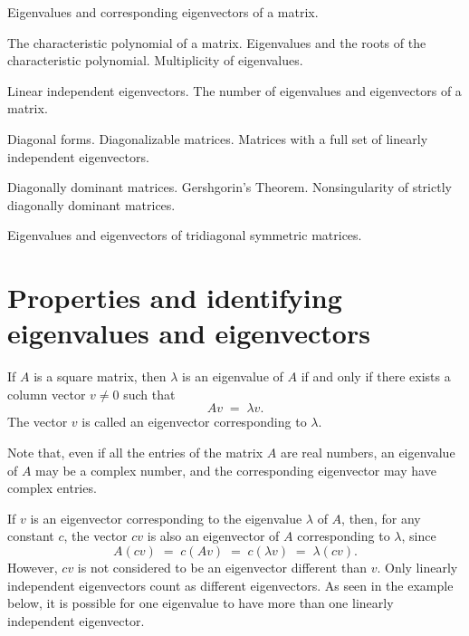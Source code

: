 
\noindent Eigenvalues and corresponding eigenvectors of a matrix.
\medskip

\noindent The characteristic polynomial of a matrix. Eigenvalues and the roots of the
characteristic polynomial. Multiplicity of eigenvalues.
\medskip

\noindent Linear independent eigenvectors. The number of eigenvalues and eigenvectors of a
matrix.
\medskip

\noindent Diagonal forms. Diagonalizable matrices. Matrices with a full set of linearly
independent eigenvectors.
\medskip

\noindent Diagonally dominant matrices. Gershgorin's Theorem. Nonsingularity of strictly
diagonally dominant matrices.
\medskip

\noindent Eigenvalues and eigenvectors of tridiagonal symmetric matrices.
\medskip

\section{Properties and identifying eigenvalues and eigenvectors}

\begin{definition}
If $A$ is a square matrix, then $\lambda$ is an eigenvalue of $A$ if and only if there
exists a column vector $v \neq 0$ such that
\begin{equation}
Av \;=\; \lambda v.
\end{equation}
The vector $v$ is called an eigenvector corresponding to $\lambda$.
\end{definition}

Note that, even if all the entries of the matrix $A$ are real numbers, an eigenvalue of
$A$ may be a complex number, and the corresponding eigenvector may have complex entries.

If $v$ is an eigenvector corresponding to the eigenvalue $\lambda$ of $A$, then, for any
constant $c$, the vector $cv$ is also an eigenvector of $A$ corresponding to $\lambda$,
since
\[
A(cv) \;=\; c(Av) \;=\; c(\lambda v) \;=\; \lambda(cv).
\]
However, $cv$ is not considered to be an eigenvector different than $v$. Only linearly
independent eigenvectors count as different eigenvectors. As seen in the example below,
it is possible for one eigenvalue to have more than one linearly independent eigenvector.

